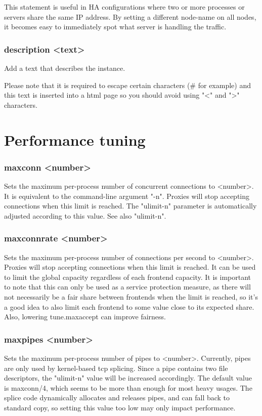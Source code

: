   This statement is useful in HA configurations where two or more processes or
  servers share the same IP address. By setting a different node-name on all
  nodes, it becomes easy to immediately spot what server is handling the
  traffic.

\subsubsection[description]{description <text>}
  Add a text that describes the instance.

  Please note that it is required to escape certain characters (\# for example)
  and this text is inserted into a html page so you should avoid using
  "<" and ">" characters.

\section{Performance tuning}

\subsubsection[maxconn]{maxconn <number>}
  Sets the maximum per-process number of concurrent connections to <number>. It
  is equivalent to the command-line argument "-n". Proxies will stop accepting
  connections when this limit is reached. The "ulimit-n" parameter is
  automatically adjusted according to this value. See also "ulimit-n".

\subsubsection[maxconnrate]{maxconnrate <number>}
  Sets the maximum per-process number of connections per second to <number>.
  Proxies will stop accepting connections when this limit is reached. It can be
  used to limit the global capacity regardless of each frontend capacity. It is
  important to note that this can only be used as a service protection measure,
  as there will not necessarily be a fair share between frontends when the
  limit is reached, so it's a good idea to also limit each frontend to some
  value close to its expected share. Also, lowering tune.maxaccept can improve
  fairness.

\subsubsection[maxpipes]{maxpipes <number>}
  Sets the maximum per-process number of pipes to <number>. Currently, pipes
  are only used by kernel-based tcp splicing. Since a pipe contains two file
  descriptors, the "ulimit-n" value will be increased accordingly. The default
  value is maxconn/4, which seems to be more than enough for most heavy usages.
  The splice code dynamically allocates and releases pipes, and can fall back
  to standard copy, so setting this value too low may only impact performance.


